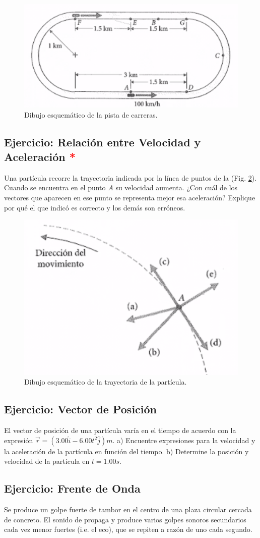 \documentclass{replab}
\begin{document}
	\begin{figure}[htbp]
		\centering
		\includegraphics[width=.4\columnwidth]{imagenes/pista.png}
		\caption{Dibujo esquemático de la pista de carreras.}
		\label{fig:pista}
	\end{figure}

	\subsection{Ejercicio: Relación entre Velocidad y Aceleración \textcolor{red}{*}}
	Una partícula recorre la trayectoria indicada por la línea de puntos de la (Fig. \ref{fig:trayectoria}). Cuando se encuentra en el punto $A$ su velocidad aumenta. ¿Con cuál de los vectores que aparecen en ese punto se representa mejor esa aceleración? Explique por qué el que indicó es correcto y los demás son erróneos. 

	\begin{figure}[htbp]
		\centering
		\includegraphics[width=.4\columnwidth]{imagenes/trayectoria.png}
		\caption{Dibujo esquemático de la trayectoria de la partícula.}
		\label{fig:trayectoria}
	\end{figure}

	\subsection{Ejercicio: Vector de Posición}
	El vector de posición de una partícula varía en el tiempo de acuerdo con la expresión $\vec{r} = (3.00\hat{i} - 6.00t^2\hat{j})m$. a) Encuentre expresiones para la velocidad y la aceleración de la partícula en función del tiempo. b) Determine la posición y velocidad de la partícula en $t = 1.00s$. 
	
	\subsection{Ejercicio: Frente de Onda}
	Se produce un golpe fuerte de tambor en el centro de una plaza circular cercada de concreto. El sonido de propaga y produce varios golpes sonoros secundarios cada vez menor fuertes (i.e. el eco), que se repiten a razón de uno cada segundo.
\end{document}
